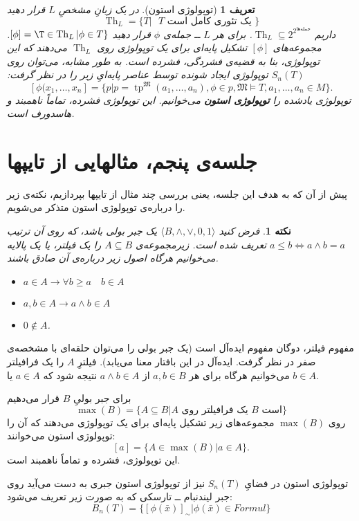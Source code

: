 \documentclass[12pt,a4paper]{report}
\theoremstyle{colorhead}
\newtheorem{defn}[thm]{تعریف}
\newtheorem{nokte}[thm]{نکته}
\DeclareMathOperator{\Th}{Th}
\DeclareMathOperator{\tp}{tp}
\begin{document}
\begin{defn}[توپولوژی استون]
در یک زبانِ مشخصِ
$L$
قرار دهید
\[
\Th_L=\{T|\text{ $T$ یک تئوری کامل است }\}
\]
داریم
$\Th_L\subseteq 2^{2^{\text{جمله‌ها}}}$.
برای هر 
$L$
ــ
جمله‌ی
$\phi$
قرار دهید
$[\phi]=\T\in \Th_L|\phi\in T\}$.
مجموعه‌های
$[\phi]$
تشکیل پایه‌ای برای یک توپولوژی روی
$\Th_L$
می‌دهند که این توپولوژی، بنا به قضیه‌ی فشردگی، فشرده است. به طور مشابه، می‌توان روی
 $S_n(T)$
 توپولوژی ایجاد شونده توسط عناصر پایه‌ایِ زیر را در نظر گرفت:
\[ 
 [\phi(x_1,\ldots,x_n]=\{p|
p=\tp^\mathfrak{M}(a_1,\ldots,a_n),
 \phi\in 
p,\mathfrak{M}\models T,a_1,\ldots,a_n\in M\}.
\]
توپولوژی یادشده را \textbf{توپولوژی استون} می‌خوانیم. این توپولوژی فشرده، تماماً ناهمبند و هاسدورف است.
\end{defn}
\pagebreak
\section{جلسه‌ی پنجم، مثالهایی از تایپها}
پیش از آن که به هدف این جلسه، یعنی 
بررسی چند مثال از تایپها بپردازیم، نکته‌ی زیر را درباره‌ی توپولوژی استون متذکر می‌شویم.
\begin{nokte}
فرض کنید
$\langle B,\wedge,\vee, 0,1\rangle$
یک جبر بولی باشد، که روی آن ترتیب 
$a\leq b\Leftrightarrow a\wedge b=a$
تعریف شده است. زیرمجموعه‌ی
$A\subseteq B$
را یک فیلتر، یا یک پالایه می‌خوانیم هرگاه
اصول زیر درباره‌ی آن صادق باشند.
\begin{itemize}
\item 
$a\in A\to \forall b\geq a \quad b\in A$
\item $a,b\in A\to a\wedge b\in A$
\item $0\not\in A$.
\end{itemize}
\end{nokte}
مفهوم
فیلتر،‌ دوگان مفهوم ایده‌آل است (یک جبر بولی را می‌توان حلقه‌ای با مشخصه‌ی صفر در نظر گرفت. ایده‌آل در این بافتار معنا می‌یابد). فیلترِ
$A$
را یک فرافیلتر می‌خوانیم هرگاه برای هر
$a,b\in B$
از
$a\wedge b\in A$
نتیجه شود که
$a\in A$
یا
$b\in A$.
\par 
برای جبر بولیِ
$B$
قرار می‌دهیم
\[
\max({B})=\{A\subseteq B| \text{$A$ یک فرافیلتر روی $B$ است}\}
\]
روی
$\max({B})$
مجموعه‌های زیر تشکیل پایه‌ای برای یک توپولوژی می‌دهند که آن را توپولوژی استون می‌خوانند:
\[
[a]=\{A\in \max(B)|a\in A\}.
\]
این توپولوژی، فشرده و تماماً ناهمبند است. 
\par 
توپولوژی استون در فضایِ
$S_n(T)$
نیز از توپولوژی استون جبری به دست می‌آید  روی جبر
لیندنبام ــ تارسکی  که به صورت زیر تعریف می‌شود:
\[
B_n(T)=\{[\phi(\bar{x})]_\sim| \phi(\bar{x})\in Formul\}
\]
\end{document}
